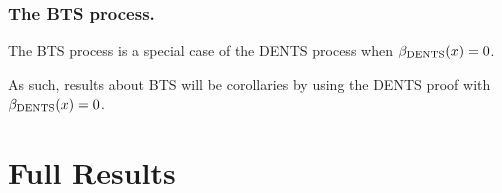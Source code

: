 






        \subsubsection{The BTS process.}
        The BTS process is a special case of the DENTS process when ${\beta_{{\textnormal{DENTS}}}}(x)=0$. 
        
        As such, results about BTS will be corollaries by using the DENTS proof with ${\beta_{{\textnormal{DENTS}}}}(x)=0$. 





    
    






\section{Full Results}
\label{sec:4-6-fullresults}

